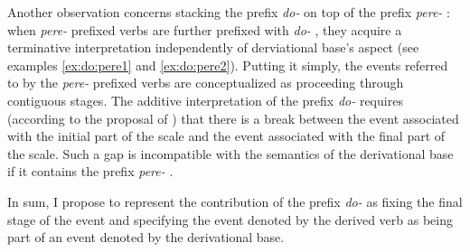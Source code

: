Another observation concerns stacking the prefix \textit{do-}   on top of the prefix  \textit{pere-}  : when \textit{pere-}  prefixed verbs are further prefixed with \textit{do-}  , they acquire a terminative  interpretation independently of derviational base's aspect (see examples \ref{ex:do:pere1} and \ref{ex:do:pere2}). Putting it simply, the events referred to by the \textit{pere-}  prefixed verbs are conceptualized as proceeding through contiguous stages. The additive interpretation of the prefix \textit{do-}   requires (according to the proposal of \citealt{Kagan:book}) that there is a break between the event associated with the initial part of the scale and the event associated with the final part of the scale. Such a gap is incompatible with the semantics of the derivational base if it contains the prefix \textit{pere-}  . 

In sum, I propose to represent the contribution of the prefix \textit{do-}   as fixing the final stage of the event and specifying the event denoted by the derived verb as being part of an event denoted by the derivational base.


